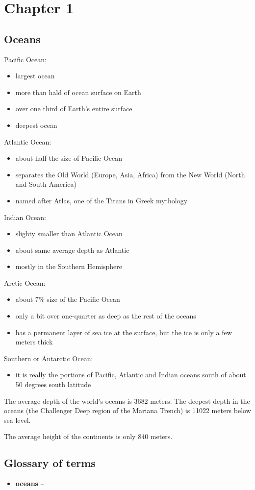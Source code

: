 \section{Chapter 1}

\subsection{Oceans}

Pacific Ocean:
\begin{itemize}
	\item largest ocean
	\item more than hald of ocean surface on Earth
	\item over one third of Earth's entire surface
	\item deepest ocean
\end{itemize}

Atlantic Ocean:
\begin{itemize}
	\item about half the size of Pacific Ocean
	\item separates the Old World (Europe, Asia, Africa) from the New World
		(North and South America)
	\item named after Atlas, one of the Titans in Greek mythology
\end{itemize}

Indian Ocean:
\begin{itemize}
	\item slighty smaller than Atlantic Ocean
	\item about same average depth as Atlantic
	\item mostly in the Southern Hemisphere
\end{itemize}

Arctic Ocean:
\begin{itemize}
	\item about 7\% size of the Pacific Ocean
	\item only a bit over one-quarter as deep as the rest of the oceans
	\item has a permanent layer of sea ice at the surface, but the ice is
		only a few meters thick
\end{itemize}

Southern or Antarctic Ocean:
\begin{itemize}
	\item it is really the portions of Pacific, Atlantic and Indian oceans
		south of about 50 degrees south latitude
\end{itemize}

The average depth of the world's oceans is 3682 meters. The deepest depth in
the oceans (the Challenger Deep region of the Mariana Trench) is 11022 meters
below sea level.

The average height of the continents is only 840 meters.

\subsection{Glossary of terms}

\begin{itemize}
	\item \textbf{oceans} -- 
\end{itemize}
